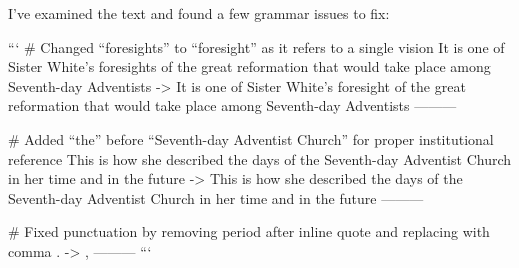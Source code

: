 I've examined the text and found a few grammar issues to fix:

```
# Changed “foresights” to “foresight” as it refers to a single vision
It is one of Sister White's foresights of the great reformation that would take place among Seventh-day Adventists
->
It is one of Sister White's foresight of the great reformation that would take place among Seventh-day Adventists
---------

# Added “the” before “Seventh-day Adventist Church” for proper institutional reference
This is how she described the days of the Seventh-day Adventist Church in her time and in the future
->
This is how she described the days of the Seventh-day Adventist Church in her time and in the future
---------

# Fixed punctuation by removing period after inline quote and replacing with comma
.
->
,
---------
```